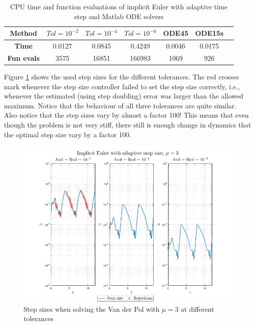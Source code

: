 \begin{table}[H]
    \centering
    \caption{CPU time and function evaluations of implicit Euler with adaptive time step and Matlab ODE solvers}
    \begin{tabular}{|c||c|c|c|c|c|c|} \hline
         \textbf{Method}    & $Tol = 10^{-2}$&   $Tol = 10^{-4}$ & $Tol = 10^{-6}$ & ODE45 & ODE15s     \\ \hline \hline 
         \textbf{Time}      & 0.0127  &  0.0845  &  0.4249 & 0.0046 & 0.0175   \\ \hline
         \textbf{Fun evals} & 3575   &     16851    &   166983 & 1069 & 926  \\ \hline
    \end{tabular}
    \label{tab3:mu3_adap}
\end{table}

Figure \ref{fig3:adap_mu3_h} shows the used step sizes for the different tolerances. The red crosses mark whenever the step size controller failed to set the step size correctly, i.e., whenever the estimated (using step doubling) error was larger than the allowed maximum. Notice that the behaviour of all three tolerances are quite similar. Also notice that the step sizes vary by almost a factor 100! This means that even though the problem is not very stiff, there still is enough change in dynamics that the optimal step size vary by a factor 100. 

\begin{figure}[H]
    \centering
    \includegraphics[width=\textwidth]{graphics/opg3/mu3_h.png}
    \caption{Step sizes when solving the Van der Pol with $\mu = 3$ at different tolerances}
    \label{fig3:adap_mu3_h}
\end{figure}

